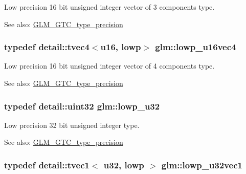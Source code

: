 Low precision 16 bit unsigned integer vector of 3 components type. \begin{Desc}
\item[See also:]\hyperlink{group__gtc__type__precision}{GLM\_\-GTC\_\-type\_\-precision} \end{Desc}
\hypertarget{group__gtc__type__precision_gb0210f390e7d75fa8eb42128a05ff23a}{
\subsubsection[lowp\_\-u16vec4]{\setlength{\rightskip}{0pt plus 5cm}typedef detail::tvec4$<$u16, lowp$>$ {\bf glm::lowp\_\-u16vec4}}}
\label{group__gtc__type__precision_gb0210f390e7d75fa8eb42128a05ff23a}


Low precision 16 bit unsigned integer vector of 4 components type. \begin{Desc}
\item[See also:]\hyperlink{group__gtc__type__precision}{GLM\_\-GTC\_\-type\_\-precision} \end{Desc}
\hypertarget{group__gtc__type__precision_gba06fae1dd98ca50c017e68345df0365}{
\subsubsection[lowp\_\-u32]{\setlength{\rightskip}{0pt plus 5cm}typedef detail::uint32 {\bf glm::lowp\_\-u32}}}
\label{group__gtc__type__precision_gba06fae1dd98ca50c017e68345df0365}


Low precision 32 bit unsigned integer type. \begin{Desc}
\item[See also:]\hyperlink{group__gtc__type__precision}{GLM\_\-GTC\_\-type\_\-precision} \end{Desc}
\hypertarget{group__gtc__type__precision_g579d71c2ae1225b689aaab0bc7d33146}{
\subsubsection[lowp\_\-u32vec1]{\setlength{\rightskip}{0pt plus 5cm}typedef detail::tvec1$<$ u32, lowp $>$ {\bf glm::lowp\_\-u32vec1}}}
\label{group__gtc__type__precision_g579d71c2ae1225b689aaab0bc7d33146}



